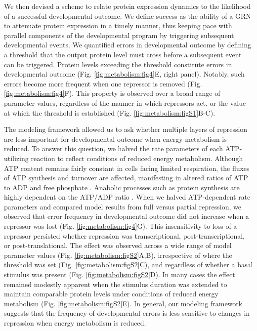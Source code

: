 We then devised a scheme to relate protein expression dynamics to the likelihood of a successful developmental outcome. We define success as the ability of a GRN to attenuate protein expression in a timely manner, thus keeping pace with parallel components of the developmental program by triggering subsequent developmental events. We quantified errors in developmental outcome by defining a threshold that the output protein level must cross before a subsequent event can be triggered. Protein levels exceeding the threshold constitute errors in developmental outcome (Fig. \ref{fig:metabolism:fig4}E, right panel). Notably, such errors become more frequent when one repressor is removed (Fig. \ref{fig:metabolism:fig4}F). This property is observed over a broad range of parameter values, regardless of the manner in which repressors act, or the value at which the threshold is established (Fig. \ref{fig:metabolism:figS1}B-C).

The modeling framework allowed us to ask whether multiple layers of repression are less important for developmental outcome when energy metabolism is reduced. To answer this question, we halved the rate parameters of each ATP-utilizing reaction to reflect conditions of reduced energy metabolism. Although ATP content remains fairly constant in cells facing limited respiration, the fluxes of ATP synthesis and turnover are affected, manifesting in altered ratios of ATP to ADP and free phosphate \cite{Brown1992}. Anabolic processes such as protein synthesis are highly dependent on the ATP/ADP ratio \cite{Atkinson1977}. When we halved ATP-dependent rate parameters and compared model results from full versus partial repression, we observed that error frequency in developmental outcome did not increase when a repressor was lost (Fig. \ref{fig:metabolism:fig4}G). This insensitivity to loss of a repressor persisted whether repression was transcriptional, post-transcriptional, or post-translational. The effect was observed across a wide range of model parameter values (Fig. \ref{fig:metabolism:figS2}A,B), irrespective of where the threshold was set (Fig. \ref{fig:metabolism:figS2}C), and regardless of whether a basal stimulus was present (Fig. \ref{fig:metabolism:figS2}D). In many cases the effect remained modestly apparent when the stimulus duration was extended to maintain comparable protein levels under conditions of reduced energy metabolism (Fig. \ref{fig:metabolism:figS2}E). In general, our modeling framework suggests that the frequency of developmental errors is less sensitive to changes in repression when energy metabolism is reduced.

